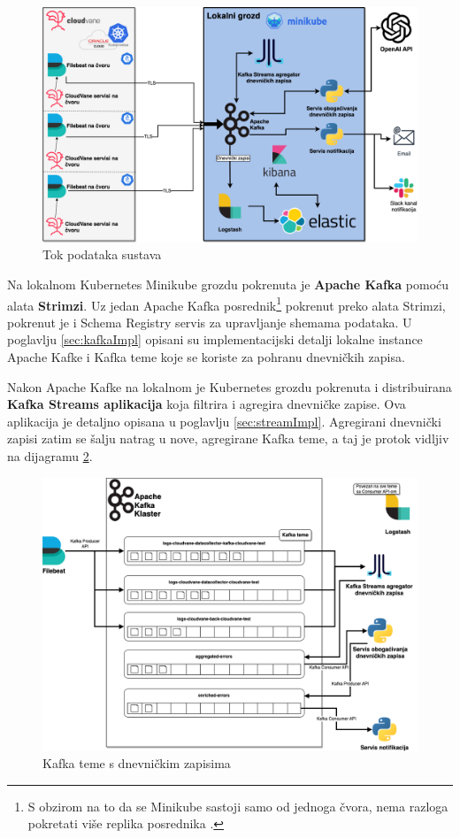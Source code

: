 \documentclass[times, utf8, diplomski]{fer}
\begin{document}
\begin{figure}[htb]
	\centering
	\includegraphics[width=15cm]{images/ThesisData.png}
	\caption[Tok podataka sustava]{Tok podataka  sustava}
	\label{fig:dataDiagram}
\end{figure}

Na lokalnom Kubernetes Minikube grozdu pokrenuta je \textbf{Apache Kafka} pomoću alata \textbf{Strimzi}. Uz jedan Apache Kafka posrednik\footnote{S obzirom na to da se Minikube sastoji samo od jednoga čvora, nema razloga pokretati više replika posrednika .}  pokrenut preko alata Strimzi, pokrenut je i Schema Registry servis za upravljanje shemama podataka. U poglavlju \ref{sec:kafkaImpl} opisani su implementacijski detalji lokalne instance Apache Kafke i Kafka teme koje se koriste za pohranu dnevničkih zapisa.

Nakon Apache Kafke na lokalnom je Kubernetes grozdu pokrenuta i distribuirana \textbf{Kafka Streams aplikacija} koja filtrira i agregira dnevničke zapise. Ova aplikacija je detaljno opisana u poglavlju \ref{sec:streamImpl}. Agregirani dnevnički zapisi zatim se šalju natrag u nove, agregirane Kafka teme, a taj je protok vidljiv na dijagramu \ref{fig:topics}.

\begin{figure}[htb]
	\centering
	\includegraphics[width=15cm]{images/KafkaTopics.png}
	\caption[Kafka teme s dnevničkim zapisima]{Kafka teme  s dnevničkim zapisima }
	\label{fig:topics}
\end{figure}
\end{document}
